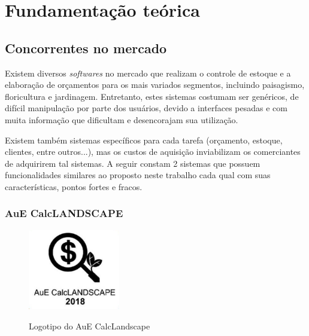 \chapter{Fundamentação teórica}

\section{Concorrentes no mercado}

Existem diversos \textit{softwares} no mercado que realizam o controle de estoque e a elaboração de orçamentos para os mais variados segmentos, incluindo paisagismo, floricultura e jardinagem.
Entretanto, estes sistemas costumam ser genéricos, de difícil manipulação por parte dos usuários, devido a interfaces pesadas e com muita informação que dificultam e desencorajam sua utilização.

Existem também sistemas específicos para cada tarefa (orçamento, estoque, clientes, entre outros...), mas os custos de aquisição inviabilizam os comerciantes de adquirirem tal sistemas. 
A seguir constam 2 sistemas que possuem funcionalidades similares ao proposto neste trabalho cada qual com suas características, pontos fortes e fracos. 

\subsection{AuE CalcLANDSCAPE}

\begin{figure}[htp]
\centering
\caption{Logotipo do AuE CalcLandscape}
\includegraphics[width=4cm]{imagens/lands.png}
\label{fig:logoAueCalc}
\end{figure}


